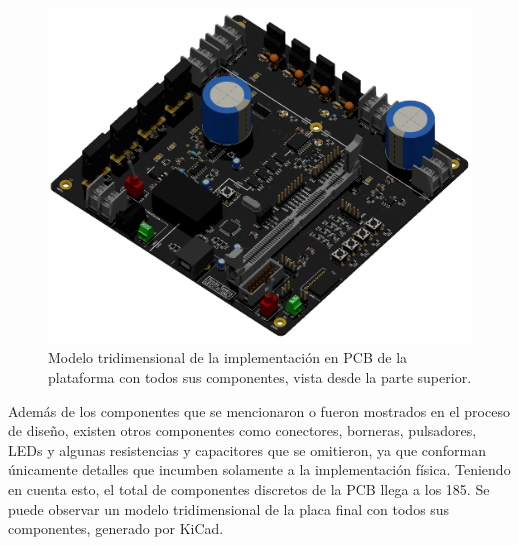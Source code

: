 
\begin{figure}[h]
    \centering
    \includegraphics[scale=0.3]{Imagenes/PCB 3D Raytracing.png}
    \caption{Modelo tridimensional de la implementación en PCB de la plataforma
    con todos sus componentes, vista desde la parte superior.}
    \label{pcb_3d}
\end{figure}

Además de los componentes que se mencionaron o fueron mostrados en el proceso de diseño, existen otros componentes como conectores, borneras, pulsadores, LEDs y algunas resistencias y capacitores que se omitieron, ya que conforman únicamente detalles que incumben solamente a la implementación física. Teniendo en cuenta esto, el total de componentes discretos de la PCB llega a los 185. Se puede observar un modelo tridimensional de la placa final con todos sus componentes, generado por KiCad.\\



\newpage



\newpage



\afterpage{\blankpage}\newpage